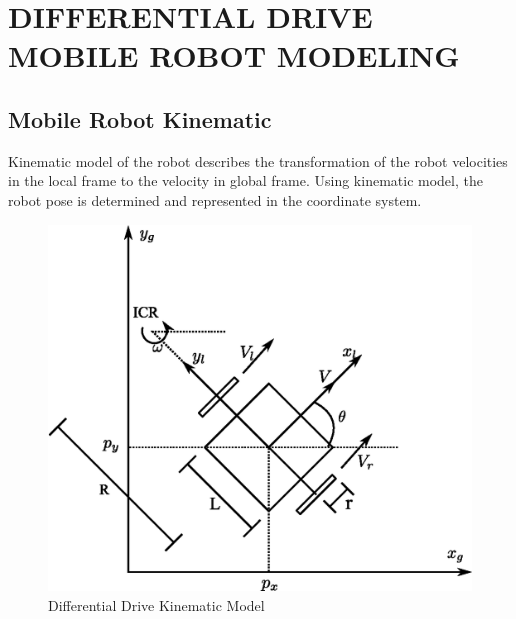 \section{DIFFERENTIAL DRIVE MOBILE ROBOT MODELING}
\subsection{Mobile Robot Kinematic}
\hspace{1.27cm}
Kinematic model of the robot describes the transformation of the robot velocities in the local frame to the velocity in global frame. Using kinematic model, the robot pose is determined and represented in the coordinate system.
\par

\begin{figure}[ht]
	\centering
	\includegraphics[scale=1]{images/imagess/4dmodel-DDmodeling.eps} 
	\caption{Differential Drive Kinematic Model}
	\label{fig:Differential Drive Kinematic Model}
\end{figure}

